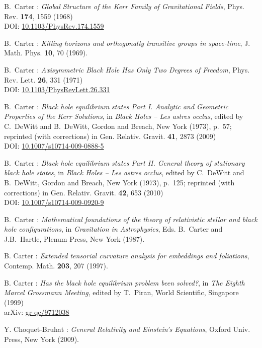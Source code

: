 \begin{thebibliography}{123}
B.~Carter :
{\em Global Structure of the Kerr Family of Gravitational Fields},
Phys. Rev. {\bf 174}, 1559 (1968)\\
DOI: \href{http://dx.doi.org/10.1103/PhysRev.174.1559}{10.1103/PhysRev.174.1559}

B.~Carter : {\em Killing horizons and orthogonally transitive groups
in space-time},
J. Math. Phys. {\bf 10}, 70 (1969).

B.~Carter : {\em Axisymmetric Black Hole Has Only Two Degrees of Freedom},
Phys. Rev. Lett. {\bf 26}, 331 (1971)\\
DOI: \href{http://dx.doi.org/10.1103/PhysRevLett.26.331}{10.1103/PhysRevLett.26.331}

B.~Carter : {\em Black hole equilibrium states Part I.
Analytic and Geometric Properties of the Kerr Solutions},
in {\em Black Holes -- Les astres occlus},  edited by C.~DeWitt and B.~DeWitt,
Gordon and Breach, New York (1973), p.~57; reprinted (with corrections) in
Gen. Relativ. Gravit. {\bf 41}, 2873 (2009)\\
DOI: \href{https://doi.org/10.1007/s10714-009-0888-5}{10.1007/s10714-009-0888-5}

B.~Carter : {\em Black hole equilibrium states Part II. General theory of stationary black hole states}, in {\em Black Holes -- Les astres occlus},  edited by C.~DeWitt and B.~DeWitt,
Gordon and Breach, New York (1973), p.~125; reprinted (with corrections) in
Gen. Relativ. Gravit. {\bf 42}, 653 (2010)\\
DOI: \href{https://doi.org/10.1007/s10714-009-0920-9}{10.1007/s10714-009-0920-9}

B.~Carter : {\em Mathematical foundations of the theory of
relativistic stellar and black hole configurations},
in {\em Gravitation in Astrophysics}, Eds. B.~Carter and J.B.~Hartle,
Plenum Press, New York (1987).

B. Carter : {\em Extended tensorial curvature analysis for embeddings
and foliations},
Contemp. Math. {\bf 203}, 207 (1997).

B. Carter : {\em Has the black hole equilibrium problem been solved?},
in {\em The Eighth Marcel Grossmann Meeting}, edited by T.~Piran,
World Scientific, Singapore (1999)\\
arXiv: \href{https://arxiv.org/abs/gr-qc/9712038}{gr-qc/9712038}

Y. Choquet-Bruhat : {\em General Relativity and Einstein's Equations},
Oxford Univ. Press, New York (2009).


\end{thebibliography}
